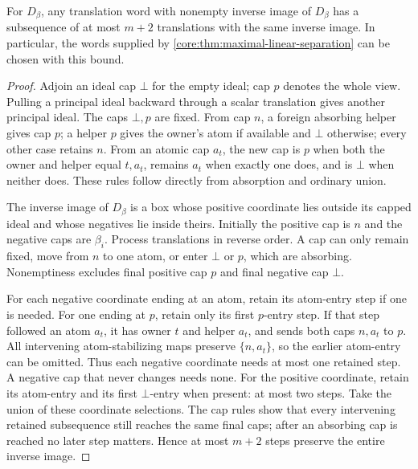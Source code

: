 \begin{proposition}
\label{core:prop:linear-separation-length}
For $D_\beta$, any translation word with nonempty inverse image of
$D_\beta$ has a subsequence of at most $m+2$ translations with the same
inverse image. In particular, the words supplied by
\cref{core:thm:maximal-linear-separation} can be chosen with this bound.
\end{proposition}
\begin{proof}
Adjoin an ideal cap $\bot$ for the empty ideal; cap $p$ denotes the
whole view. Pulling a principal ideal backward through a scalar
translation gives another principal ideal. The caps $\bot,p$ are fixed.
From cap $n$, a foreign absorbing helper gives cap $p$; a helper $p$
gives the owner's atom if available and $\bot$ otherwise; every other
case retains $n$. From an atomic cap $a_t$, the new cap is $p$ when
both the owner and helper equal $t,a_t$, remains $a_t$ when exactly one
does, and is $\bot$ when neither does. These rules follow directly from
absorption and ordinary union.

The inverse image of $D_\beta$ is a box whose positive coordinate lies
outside its capped ideal and whose negatives lie inside theirs.
Initially the positive cap is $n$ and the negative caps are $\beta_i$.
Process translations in reverse order. A cap can only remain fixed,
move from $n$ to one atom, or enter $\bot$ or $p$, which are absorbing.
Nonemptiness excludes final positive cap $p$ and final negative cap
$\bot$.

For each negative coordinate ending at an atom, retain its atom-entry
step if one is needed. For one ending at $p$, retain only its first
$p$-entry step. If that step followed an atom $a_t$, it has owner $t$
and helper $a_t$, and sends both caps $n,a_t$ to $p$.
All intervening atom-stabilizing maps preserve $\{n,a_t\}$, so the
earlier atom-entry can be omitted. Thus each negative coordinate needs
at most one retained step. A negative cap that never changes needs none.
For the positive coordinate, retain its atom-entry and its first
$\bot$-entry when present: at most two steps. Take the union of these
coordinate selections. The cap rules show that every intervening
retained subsequence still reaches the same final caps; after an
absorbing cap is reached no later step matters. Hence at most $m+2$
steps preserve the entire inverse image.
\end{proof}

